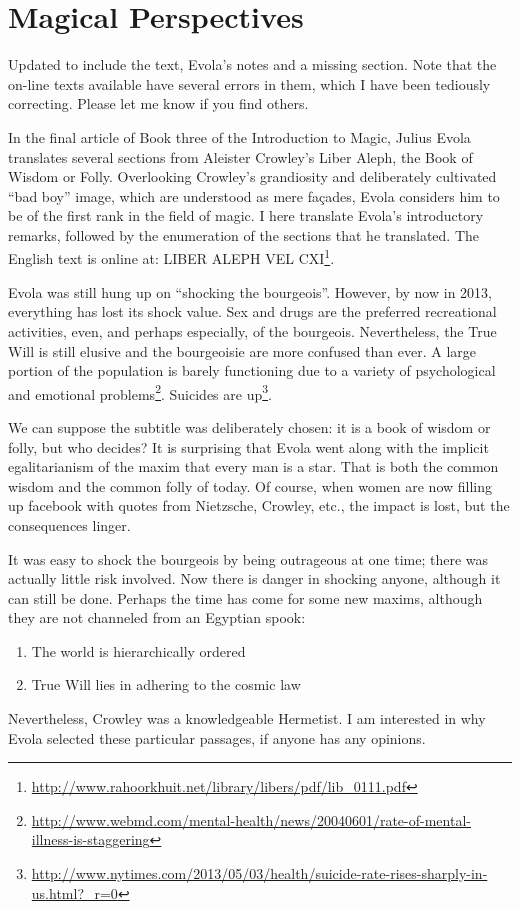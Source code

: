 \section{Magical Perspectives}

Updated to include the text, Evola's notes and a missing section. Note that the on-line texts available have several errors in them, which I have been tediously correcting. Please let me know if you find others.

\begin{quotationx}
In the final article of Book three of the Introduction to Magic, Julius Evola translates several sections from Aleister Crowley's Liber Aleph, the Book of Wisdom or Folly. Overlooking Crowley's grandiosity and deliberately cultivated ``bad boy'' image, which are understood as mere façades, Evola considers him to be of the first rank in the field of magic. I here translate Evola's introductory remarks, followed by the enumeration of the sections that he translated. The English text is online at: LIBER ALEPH VEL CXI\footnote{\url{http://www.rahoorkhuit.net/library/libers/pdf/lib\_0111.pdf}}.

Evola was still hung up on ``shocking the bourgeois''. However, by now in 2013, everything has lost its shock value. Sex and drugs are the preferred recreational activities, even, and perhaps especially, of the bourgeois. Nevertheless, the True Will is still elusive and the bourgeoisie are more confused than ever. A large portion of the population is barely functioning due to a variety of psychological and emotional problems\footnote{\url{http://www.webmd.com/mental-health/news/20040601/rate-of-mental-illness-is-staggering}}. Suicides are up\footnote{\url{http://www.nytimes.com/2013/05/03/health/suicide-rate-rises-sharply-in-us.html?\_r=0}}.

We can suppose the subtitle was deliberately chosen: it is a book of wisdom or folly, but who decides? It is surprising that Evola went along with the implicit egalitarianism of the maxim that every man is a star. That is both the common wisdom and the common folly of today. Of course, when women are now filling up facebook with quotes from Nietzsche, Crowley, etc., the impact is lost, but the consequences linger.

It was easy to shock the bourgeois by being outrageous at one time; there was actually little risk involved. Now there is danger in shocking anyone, although it can still be done. Perhaps the time has come for some new maxims, although they are not channeled from an Egyptian spook:

\begin{enumerate}
\item The world is hierarchically ordered
\item True Will lies in adhering to the cosmic law
\end{enumerate}

Nevertheless, Crowley was a knowledgeable Hermetist. I am interested in why Evola selected these particular passages, if anyone has any opinions.
\end{quotationx}

